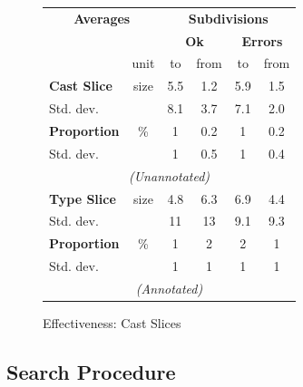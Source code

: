 \begin{figure}[h]
  \centering
  \begin{tabular}{lc|cc|cc}
  \multicolumn{2}{c}{\textbf{Averages}} & \multicolumn{4}{c}{\textbf{Subdivisions}}\\
  & & \multicolumn{2}{c|}{\textbf{Ok}} & \multicolumn{2}{c}{\textbf{Errors}}\\ 
   & unit & to & from & to & from\\
   \hline
   \textbf{Cast Slice} & size &  5.5 & 1.2 & 5.9 & 1.5 \\
   Std. dev. &  				 &  8.1 & 3.7 & 7.1 & 2.0\\
   \textbf{Proportion}& \%    & 1 & 0.2 & 1 & 0.2\\
   Std. dev. &  				 &  1 & 0.5 & 1 & 0.4\\
   \multicolumn{6}{c}{\textit{(Unannotated)}}\\
   \textbf{Type Slice} & size &  4.8 & 6.3 & 6.9 & 4.4  \\
   Std. dev. 			&    &  11 & 13 & 9.1 & 9.3\\
   \textbf{Proportion}& \% 	 & 1 & 2 & 2 & 1\\
   Std. dev. &  				 &  1 & 1 & 1 & 1\\
   \multicolumn{6}{c}{\textit{(Annotated)}}
  \end{tabular}
  \caption{Effectiveness: Cast Slices}
\label{fig:CastSlicingEffectiveness}
\end{figure}


\subsection{Search Procedure}

